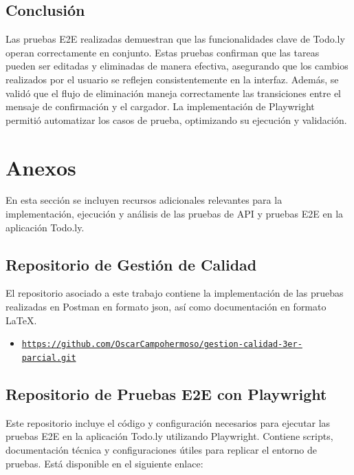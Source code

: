 \documentclass{report}
\begin{document}
\section{Conclusión}

Las pruebas E2E realizadas demuestran que las funcionalidades clave de Todo.ly operan correctamente en conjunto. Estas pruebas confirman que las tareas pueden ser editadas y eliminadas de manera efectiva, asegurando que los cambios realizados por el usuario se reflejen consistentemente en la interfaz. Además, se validó que el flujo de eliminación maneja correctamente las transiciones entre el mensaje de confirmación y el cargador. La implementación de Playwright permitió automatizar los casos de prueba, optimizando su ejecución y validación.


\chapter{Anexos}

En esta sección se incluyen recursos adicionales relevantes para la implementación, ejecución y análisis de las pruebas de API y pruebas E2E en la aplicación Todo.ly.

\section{Repositorio de Gestión de Calidad}

El repositorio asociado a este trabajo contiene la implementación de las pruebas realizadas en Postman en formato json, así como documentación en formato \LaTeX{}.

\begin{itemize}
    \item \href{https://github.com/OscarCampohermoso/gestion-calidad-3er-parcial.git}{\texttt{https://github.com/OscarCampohermoso/gestion-calidad-3er-parcial.git}}
\end{itemize}

\section{Repositorio de Pruebas E2E con Playwright}

Este repositorio incluye el código y configuración necesarios para ejecutar las pruebas E2E en la aplicación Todo.ly utilizando Playwright. Contiene scripts, documentación técnica y configuraciones útiles para replicar el entorno de pruebas. Está disponible en el siguiente enlace:
\end{document}
